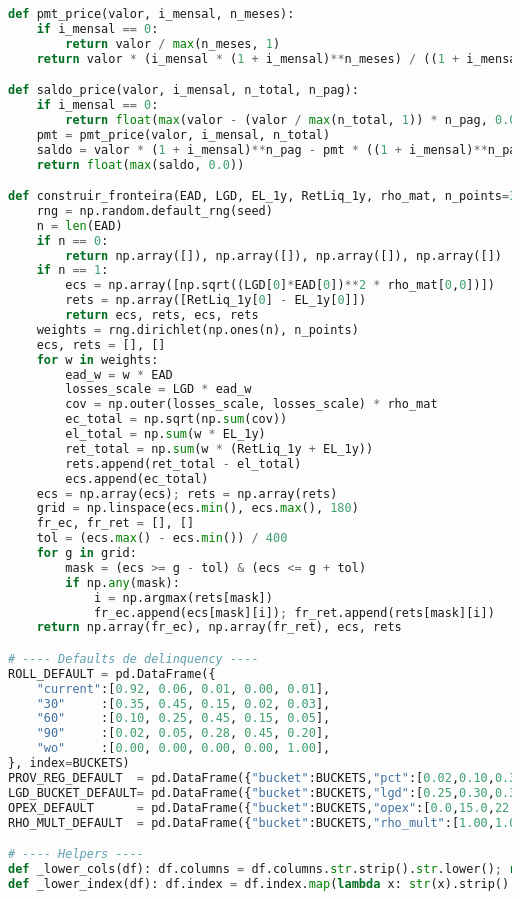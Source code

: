 \documentclass[11pt,a4paper]{article}
\newcommand{\1}{\mathbf{1}}
\begin{document}
\begin{lstlisting}[language=Python, caption={risk_frontier.py}]
def pmt_price(valor, i_mensal, n_meses):
    if i_mensal == 0:
        return valor / max(n_meses, 1)
    return valor * (i_mensal * (1 + i_mensal)**n_meses) / ((1 + i_mensal)**n_meses - 1)

def saldo_price(valor, i_mensal, n_total, n_pag):
    if i_mensal == 0:
        return float(max(valor - (valor / max(n_total, 1)) * n_pag, 0.0))
    pmt = pmt_price(valor, i_mensal, n_total)
    saldo = valor * (1 + i_mensal)**n_pag - pmt * ((1 + i_mensal)**n_pag - 1) / i_mensal
    return float(max(saldo, 0.0))

def construir_fronteira(EAD, LGD, EL_1y, RetLiq_1y, rho_mat, n_points=30000, seed=SEED):
    rng = np.random.default_rng(seed)
    n = len(EAD)
    if n == 0:
        return np.array([]), np.array([]), np.array([]), np.array([])
    if n == 1:
        ecs = np.array([np.sqrt((LGD[0]*EAD[0])**2 * rho_mat[0,0])])
        rets = np.array([RetLiq_1y[0] - EL_1y[0]])
        return ecs, rets, ecs, rets
    weights = rng.dirichlet(np.ones(n), n_points)
    ecs, rets = [], []
    for w in weights:
        ead_w = w * EAD
        losses_scale = LGD * ead_w
        cov = np.outer(losses_scale, losses_scale) * rho_mat
        ec_total = np.sqrt(np.sum(cov))
        el_total = np.sum(w * EL_1y)
        ret_total = np.sum(w * (RetLiq_1y + EL_1y))
        rets.append(ret_total - el_total)
        ecs.append(ec_total)
    ecs = np.array(ecs); rets = np.array(rets)
    grid = np.linspace(ecs.min(), ecs.max(), 180)
    fr_ec, fr_ret = [], []
    tol = (ecs.max() - ecs.min()) / 400
    for g in grid:
        mask = (ecs >= g - tol) & (ecs <= g + tol)
        if np.any(mask):
            i = np.argmax(rets[mask])
            fr_ec.append(ecs[mask][i]); fr_ret.append(rets[mask][i])
    return np.array(fr_ec), np.array(fr_ret), ecs, rets

# ---- Defaults de delinquency ----
ROLL_DEFAULT = pd.DataFrame({
    "current":[0.92, 0.06, 0.01, 0.00, 0.01],
    "30"     :[0.35, 0.45, 0.15, 0.02, 0.03],
    "60"     :[0.10, 0.25, 0.45, 0.15, 0.05],
    "90"     :[0.02, 0.05, 0.28, 0.45, 0.20],
    "wo"     :[0.00, 0.00, 0.00, 0.00, 1.00],
}, index=BUCKETS)
PROV_REG_DEFAULT  = pd.DataFrame({"bucket":BUCKETS,"pct":[0.02,0.10,0.30,0.50,1.00]})
LGD_BUCKET_DEFAULT= pd.DataFrame({"bucket":BUCKETS,"lgd":[0.25,0.30,0.35,0.40,0.45]})
OPEX_DEFAULT      = pd.DataFrame({"bucket":BUCKETS,"opex":[0.0,15.0,22.0,35.0,80.0]})
RHO_MULT_DEFAULT  = pd.DataFrame({"bucket":BUCKETS,"rho_mult":[1.00,1.05,1.10,1.15,1.20]})

# ---- Helpers ----
def _lower_cols(df): df.columns = df.columns.str.strip().str.lower(); return df
def _lower_index(df): df.index = df.index.map(lambda x: str(x).strip().lower()); return df


\end{lstlisting}
\end{document}
